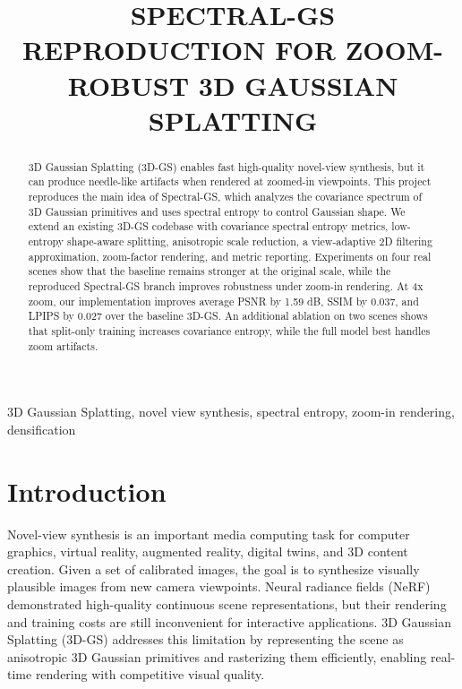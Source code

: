 \documentclass{article}
\begin{document}
\sloppy

\def\x{{\mathbf x}}
\def\L{{\cal L}}
\def\method{{Spectral-GS}}

\title{SPECTRAL-GS REPRODUCTION FOR ZOOM-ROBUST 3D GAUSSIAN SPLATTING}

\address{COMP5405/4405 Digital Media Computing Project}

\maketitle

\begin{abstract}
3D Gaussian Splatting (3D-GS) enables fast high-quality novel-view synthesis, but it can produce needle-like artifacts when rendered at zoomed-in viewpoints. This project reproduces the main idea of Spectral-GS, which analyzes the covariance spectrum of 3D Gaussian primitives and uses spectral entropy to control Gaussian shape. We extend an existing 3D-GS codebase with covariance spectral entropy metrics, low-entropy shape-aware splitting, anisotropic scale reduction, a view-adaptive 2D filtering approximation, zoom-factor rendering, and metric reporting. Experiments on four real scenes show that the baseline remains stronger at the original scale, while the reproduced Spectral-GS branch improves robustness under zoom-in rendering. At 4x zoom, our implementation improves average PSNR by 1.59 dB, SSIM by 0.037, and LPIPS by 0.027 over the baseline 3D-GS. An additional ablation on two scenes shows that split-only training increases covariance entropy, while the full model best handles zoom artifacts.
\end{abstract}

\begin{keywords}
3D Gaussian Splatting, novel view synthesis, spectral entropy, zoom-in rendering, densification
\end{keywords}

\section{Introduction}
\label{sec:intro}

Novel-view synthesis is an important media computing task for computer graphics, virtual reality, augmented reality, digital twins, and 3D content creation. Given a set of calibrated images, the goal is to synthesize visually plausible images from new camera viewpoints. Neural radiance fields (NeRF) \cite{mildenhall2020nerf} demonstrated high-quality continuous scene representations, but their rendering and training costs are still inconvenient for interactive applications. 3D Gaussian Splatting (3D-GS) \cite{kerbl20233dgs} addresses this limitation by representing the scene as anisotropic 3D Gaussian primitives and rasterizing them efficiently, enabling real-time rendering with competitive visual quality.
\end{document}
